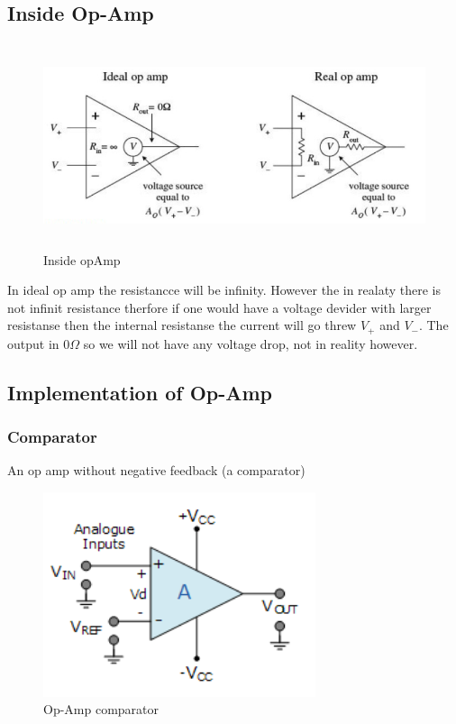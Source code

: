 \subsection{Inside Op-Amp}
\begin{figure}[h]
    \vspace{10mm}
    \centering
    \includegraphics[width=12cm, height=6cm]{image/inside-opamp.png}
    \caption{Inside opAmp}
\end{figure}
In ideal op amp the resistancce will be infinity. However the in realaty
there is not infinit resistance therfore if one would have a voltage devider
with larger resistanse then the internal resistanse the current will 
go threw $V_+$ and $V_-$. The output in $0\Omega$ so we will not have any
voltage drop, not in reality however.

\newpage
\subsection{Implementation of Op-Amp}
\subsubsection{Comparator}
An op amp without negative feedback (a comparator)
\begin{figure}[h]
    \vspace{10mm}
    \centering
    \includegraphics[width=8cm, height=6cm]{image/op-amp-comparator.png}
    \caption{Op-Amp comparator}
\end{figure}

